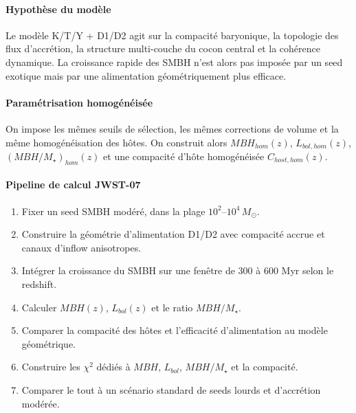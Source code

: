 \documentclass[11pt,a4paper]{article}
\begin{document}
\paragraph{Hypothèse du modèle}
Le modèle K/T/Y + D1/D2 agit sur la compacité baryonique, la topologie des flux d'accrétion, la structure multi-couche du cocon central et la cohérence dynamique. La croissance rapide des SMBH n'est alors pas imposée par un seed exotique mais par une alimentation géométriquement plus efficace.

\paragraph{Paramétrisation homogénéisée}
On impose les mêmes seuils de sélection, les mêmes corrections de volume et la même homogénéisation des hôtes. On construit alors $MBH_{hom}(z)$, $L_{bol,hom}(z)$, $(MBH/M_\star)_{hom}(z)$ et une compacité d'hôte homogénéisée $C_{host,hom}(z)$.

\paragraph{Pipeline de calcul JWST-07}
\begin{enumerate}[leftmargin=*,itemsep=0.2em,topsep=0.2em]
\item Fixer un seed SMBH modéré, dans la plage $10^2$--$10^4\,M_\odot$.
\item Construire la géométrie d'alimentation D1/D2 avec compacité accrue et canaux d'inflow anisotropes.
\item Intégrer la croissance du SMBH sur une fenêtre de 300 à 600 Myr selon le redshift.
\item Calculer $MBH(z)$, $L_{bol}(z)$ et le ratio $MBH/M_\star$.
\item Comparer la compacité des hôtes et l'efficacité d'alimentation au modèle géométrique.
\item Construire les $\chi^2$ dédiés à $MBH$, $L_{bol}$, $MBH/M_\star$ et la compacité.
\item Comparer le tout à un scénario standard de seeds lourds et d'accrétion modérée.
\end{enumerate}
\end{document}
